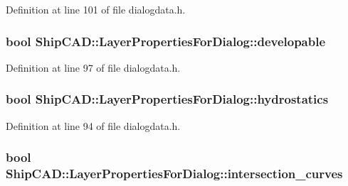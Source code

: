 Definition at line 101 of file dialogdata.\+h.

\subsubsection[{\texorpdfstring{developable}{developable}}]{\setlength{\rightskip}{0pt plus 5cm}bool Ship\+C\+A\+D\+::\+Layer\+Properties\+For\+Dialog\+::developable}\hypertarget{structShipCAD_1_1LayerPropertiesForDialog_ab2610addf8f227b9b9f00e9f275f6342}{}\label{structShipCAD_1_1LayerPropertiesForDialog_ab2610addf8f227b9b9f00e9f275f6342}


Definition at line 97 of file dialogdata.\+h.

\subsubsection[{\texorpdfstring{hydrostatics}{hydrostatics}}]{\setlength{\rightskip}{0pt plus 5cm}bool Ship\+C\+A\+D\+::\+Layer\+Properties\+For\+Dialog\+::hydrostatics}\hypertarget{structShipCAD_1_1LayerPropertiesForDialog_a2ac6ce1339e9dfc028016c5bacea3cae}{}\label{structShipCAD_1_1LayerPropertiesForDialog_a2ac6ce1339e9dfc028016c5bacea3cae}


Definition at line 94 of file dialogdata.\+h.

\subsubsection[{\texorpdfstring{intersection\+\_\+curves}{intersection_curves}}]{\setlength{\rightskip}{0pt plus 5cm}bool Ship\+C\+A\+D\+::\+Layer\+Properties\+For\+Dialog\+::intersection\+\_\+curves}\hypertarget{structShipCAD_1_1LayerPropertiesForDialog_a6003cb18c39e66df709658c14203d066}{}\label{structShipCAD_1_1LayerPropertiesForDialog_a6003cb18c39e66df709658c14203d066}



